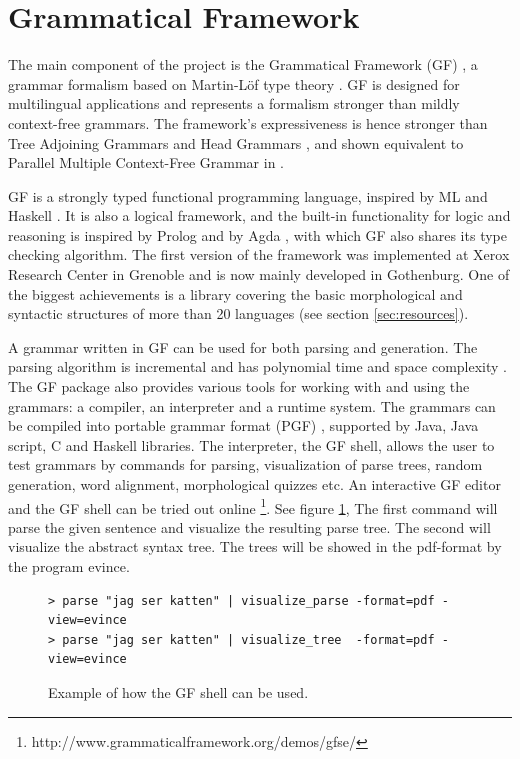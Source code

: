 \documentclass{report}
\begin{document}
\section{Grammatical Framework}
\label{sec:gf}
The main component of the project is the Grammatical Framework (GF) \cite{gfbok}, %
a grammar formalism based on Martin-Löf type theory \cite{martinlof}. GF is
designed for multilingual applications and represents a formalism
stronger than mildly context-free grammars. 
The framework's %
expressiveness is hence stronger than 
Tree Adjoining Grammars \cite{tag} and Head Grammars \cite{hg}, and shown
equivalent to Parallel Multiple Context-Free Grammar \cite{pmcfg} in \cite{peter}.

GF is a strongly typed functional programming language, inspired by
ML \cite{ml} and Haskell \cite{haskell}. It is also a logical framework,
and the built-in functionality for logic and reasoning 
is inspired by \textlambda Prolog \cite{prolog} and 
by Agda \cite{agda}, with which GF also shares its type checking algorithm.
The first version of the framework was implemented at Xerox Research Center
in Grenoble and is now mainly developed in Gothenburg. One of the biggest
achievements is a library covering the 
basic morphological and syntactic structures of more than
20 languages (see section \ref{sec:resources}).


A grammar written in GF can be used for both parsing and generation.
The parsing algorithm is incremental and has polynomial time and space
complexity \cite{gfMech}. 
The GF package also provides various tools for working with and using the grammars:
a compiler, an interpreter and a runtime system.
The grammars can be compiled into portable grammar format (PGF) \cite{pgf},
supported by %
Java, Java script, C and Haskell libraries. 
The interpreter, the GF shell, allows
the user to test grammars by commands for parsing, visualization of parse trees,
random generation, word alignment, morphological quizzes etc.
An interactive GF editor and the GF shell can be tried out online 
\footnote{http://www.grammaticalframework.org/demos/gfse/}. See figure \ref{fig:shell},
 The first command will parse the given
sentence and visualize the resulting parse tree. The second will visualize the 
abstract syntax tree. The trees will be showed in the pdf-format by the program evince.
\thispagestyle{plain}
\begin{figure}[h]
\begin{verbatim} 
> parse "jag ser katten" | visualize_parse -format=pdf -view=evince
> parse "jag ser katten" | visualize_tree  -format=pdf -view=evince
\end{verbatim}
\caption{Example of how the GF shell can be used.}\label{fig:shellvp}
\label{fig:shell}
\end{figure}
\end{document}
